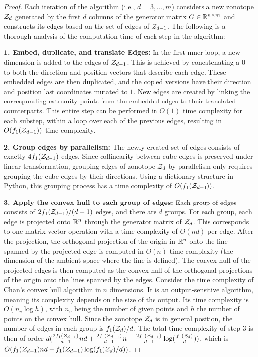 \begin{proof}
    Each iteration of the algorithm (i.e., $d=3,\dots, m$) considers a new zonotope $\mathcal{Z}_d$ generated by the first $d$ columns of the generator matrix $G\in\mathbb{R}^{n\times m}$ and constructs its edges based on the set of edges of $\mathcal{Z}_{d-1}$. The following is a thorough analysis of the computation time of each step in the algorithm:

    \textbf{1. Embed, duplicate, and translate Edges:} In the first inner loop, a new dimension is added to the edges of $\mathcal{Z}_{d-1}$. This is achieved by concatenating a $0$ to both the direction and position vectors that describe each edge. These embedded edges are then duplicated, and the copied versions have their direction and position last coordinates mutated to $1$. New edges are created by linking the corresponding extremity points from the embedded edges to their translated counterparts. This entire step can be performed in $O(1)$ time complexity for each substep, within a loop over each of the previous edges, resulting in $O(f_1({\mathcal{Z}_{d-1}}))$ time complexity.

    \textbf{2. Group edges by parallelism:} The newly created set of edges consists of exactly $4f_1(\mathcal{Z}_{d-1})$ edges. Since collinearity between cube edges is preserved under linear transformation, grouping edges of zonotope $\mathcal{Z}_d$ by parallelism only requires grouping the cube edges by their directions. Using a dictionary structure in Python, this grouping process has a time complexity of $O(f_1(\mathcal{Z}_{d-1}))$.
    
    \textbf{3. Apply the convex hull to each group of edges:} Each group of edges consists of $2f_1(\mathcal{Z}_{d-1}) / (d-1)$ edges, and there are $d$ groups. For each group, each edge is projected onto $\mathbb{R}^n$ through the generator matrix of $\mathcal{Z}_d$. This corresponds to one matrix-vector operation with a time complexity of $O(nd)$ per edge. After the projection, the orthogonal projection of the origin in $\mathbb{R}^n$ onto the line spanned by the projected edge is computed in $O(n)$ time complexity (the dimension of the ambient space where the line is defined). The convex hull of the projected edges is then computed as the convex hull of the orthogonal projections of the origin onto the lines spanned by the edges. Consider the time complexity of Chan's convex hull algorithm in $n$ dimensions. It is an output-sensitive algorithm, meaning its complexity depends on the size of the output. Its time complexity is $O(n_v\log h)$, with $n_v$ being the number of given points and $h$ the number of points on the convex hull. Since the zonotope $\mathcal{Z}_d$ is in general position, the number of edges in each group is $f_1(\mathcal{Z}_d) / d$. The total time complexity of step 3 is then of order 
    $d (\frac{2f_1(\mathcal{Z}_{d-1})}{d-1}nd + \frac{2f_1(\mathcal{Z}_{d-1})}{d-1}n + \frac{2f_1(\mathcal{Z}_{d-1})}{d-1}\log(\frac{f_1(\mathcal{Z}_{d})}{d}))$, which is
    $O(f_1(\mathcal{Z}_{d-1}) nd +f_1(\mathcal{Z}_{d-1})  \log(f_1(\mathcal{Z}_{d}) / d))$.


\end{proof}
